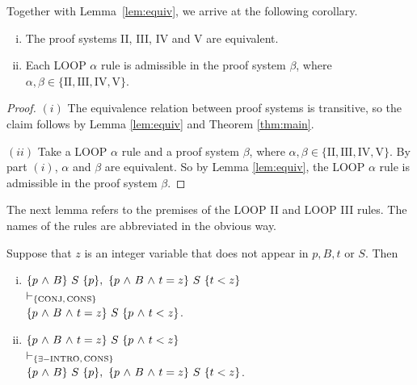 \documentclass[runningheads]{llncs}       %
\begin{document}
Together with Lemma~\ref{lem:equiv}, we arrive at the following corollary.

\begin{corollary} \label{cor:main}
  \mbox{}
  
  \begin{enumerate}[(i)]
  \item The proof systems II, III, IV and V are equivalent.

  \item Each LOOP $\alpha$ rule is admissible in the proof system $\beta$, 
        where $\alpha, \beta \in \{\mathrm{II, III, IV, V}\}$.
  \end{enumerate}
\end{corollary}

\begin{proof}

  \NI
  $(i)$   The equivalence relation between proof systems is transitive, so
  the claim follows by Lemma \ref{lem:equiv} and Theorem \ref{thm:main}.

  \smallskip
  
  \NI
  $(ii)$
  Take a LOOP $\alpha$ rule and a proof system $\beta$, where
  $\alpha, \beta \in \{\mathrm{II, III, IV, V}\}$.
  By part $(i)$, $\alpha$ and $\beta$
  are equivalent. So by Lemma \ref{lem:equiv}, the LOOP $\alpha$
  rule is admissible in the proof system $\beta$.
  \HB
\end{proof}



The next lemma refers to the premises of the LOOP II and
LOOP III rules. The names of the rules are abbreviated in the obvious way.

\begin{lemma} \label{lem:1}
Suppose that $z$ is an integer variable that
does not appear in $p,B,t$ or $S$.
Then
  \begin{enumerate} [(i)]
   \item 
     \quad $\mbox{$\{{p \mbox{$\ \wedge\ $} B}\}\ {S}\ \{{p}\}$}, \ \mbox{$\{{p \mbox{$\ \wedge\ $} B \mbox{$\ \wedge\ $} t=z}\}\ {S}\ \{{t<z}\}$}$ \\
     $\vdash_{\{\rm{CONJ}, \, \rm{CONS}\}}$ \\
     \mbox{} \quad $\mbox{$\{{p \mbox{$\ \wedge\ $} B \mbox{$\ \wedge\ $} t=z}\}\ {S}\ \{{p \mbox{$\ \wedge\ $} t<z}\}$}$.
    
   \item
     \quad $\mbox{$\{{p \mbox{$\ \wedge\ $} B \mbox{$\ \wedge\ $} t=z}\}\ {S}\ \{{p \mbox{$\ \wedge\ $} t<z}\}$}$ \\
     $\vdash_{\{\exists -{\rm INTRO}, \, \rm{CONS}\}}$ \\
     \mbox{} \quad $\mbox{$\{{p \mbox{$\ \wedge\ $} B}\}\ {S}\ \{{p}\}$}, \ \mbox{$\{{p \mbox{$\ \wedge\ $} B \mbox{$\ \wedge\ $} t=z}\}\ {S}\ \{{t<z}\}$}$.

  \end{enumerate}
\end{lemma}
\end{document}

